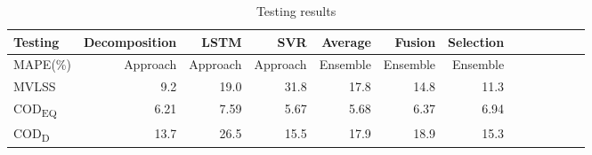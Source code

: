 \begin{longtable}[h]{@{}l *{6}{rr}}
\caption[Testing results]{Testing results}
\label{t:ResultsTest}
\\
%   
\toprule%


 {\bfseries Testing} & {\bfseries Decomposition} & {\bfseries LSTM} & {\bfseries SVR} & {\bfseries Average} & {\bfseries Fusion} & {\bfseries Selection}
\\

\cmidrule[0.4pt](r{0.125em}){1-1}%
\cmidrule[0.4pt](lr{0.125em}){2-7}%



  \endfirsthead

\endhead


        MAPE(\%) & Approach & Approach  & Approach  & Ensemble  & Ensemble  & Ensemble   \\ 
        \hline
        MVLSS  & 9.2  & 19.0 & 31.8  & 17.8  & 14.8  & 11.3  \\ 
        COD\textsubscript{EQ}  & 6.21  & 7.59  & 5.67  & 5.68  & 6.37  & 6.94  \\ 
        COD\textsubscript{D} & 13.7  & 26.5  & 15.5  & 17.9  & 18.9  & 15.3  \\ 


\bottomrule

\end{longtable}